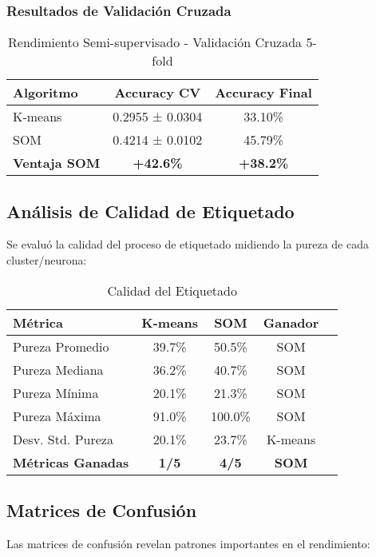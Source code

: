 \documentclass[12pt,a4paper]{article}
\begin{document}
\subsubsection{Resultados de Validación Cruzada}
\begin{table}[H]
\centering
\caption{Rendimiento Semi-supervisado - Validación Cruzada 5-fold}
\begin{tabular}{lcc}
\toprule
\textbf{Algoritmo} & \textbf{Accuracy CV} & \textbf{Accuracy Final} \\
\midrule
K-means & 0.2955 ± 0.0304 & 33.10\% \\
SOM & 0.4214 ± 0.0102 & 45.79\% \\
\midrule
\textbf{Ventaja SOM} & \textbf{+42.6\%} & \textbf{+38.2\%} \\
\bottomrule
\end{tabular}
\end{table}

\subsection{Análisis de Calidad de Etiquetado}

Se evaluó la calidad del proceso de etiquetado midiendo la pureza de cada cluster/neurona:

\begin{table}[H]
\centering
\caption{Calidad del Etiquetado}
\begin{tabular}{lcccc}
\toprule
\textbf{Métrica} & \textbf{K-means} & \textbf{SOM} & \textbf{Ganador} \\
\midrule
Pureza Promedio & 39.7\% & 50.5\% & SOM \\
Pureza Mediana & 36.2\% & 40.7\% & SOM \\
Pureza Mínima & 20.1\% & 21.3\% & SOM \\
Pureza Máxima & 91.0\% & 100.0\% & SOM \\
Desv. Std. Pureza & 20.1\% & 23.7\% & K-means \\
\midrule
\textbf{Métricas Ganadas} & \textbf{1/5} & \textbf{4/5} & \textbf{SOM} \\
\bottomrule
\end{tabular}
\end{table}

\subsection{Matrices de Confusión}

Las matrices de confusión revelan patrones importantes en el rendimiento:
\end{document}
